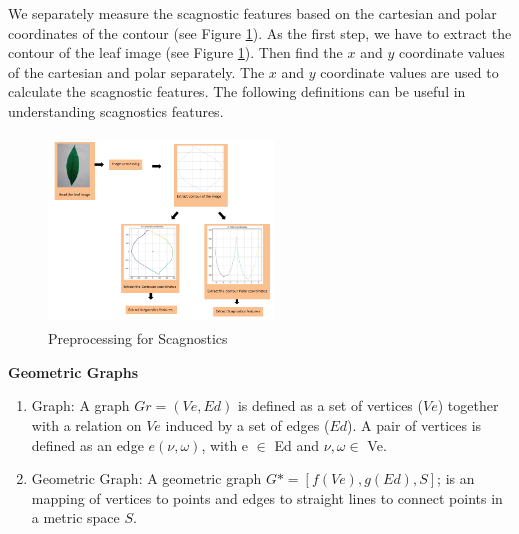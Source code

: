 \documentclass{article}
\begin{document}
We separately measure the scagnostic features based on the cartesian
and polar coordinates of the contour (see Figure \ref{scp}). As the first
step, we have to extract the contour of the leaf image (see Figure
\ref{scp}). Then find the \(x\) and \(y\) coordinate values of the
cartesian and polar separately. The \(x\) and \(y\) coordinate values are
used to calculate the scagnostic features. The following definitions can
be useful in understanding scagnostics features.\\


\begin{figure}[!ht]
        
\centering
        \includegraphics[width=60mm, height=50mm]{Figures/scp.png}
        
        

\caption{\label{scp}Preprocessing for Scagnostics}
        \end{figure}

\textbf{Geometric Graphs}

\begin{enumerate}
\def\labelenumi{\roman{enumi})}
\item
  Graph: A graph \(Gr = (Ve, Ed)\) is defined as a set of vertices
  (\(Ve\)) together with a relation on \(Ve\) induced by a set of edges
  (\(Ed\)). A pair of vertices is defined as an edge \(e(\nu,\omega)\),
  with e \(\in\) Ed and \(\nu,\omega \in\) Ve.
\item
  Geometric Graph: A geometric graph \(G* = [f(Ve), g(Ed), S]\); is an
  mapping of vertices to points and edges to straight lines to connect
  points in a metric space \(S\).
\end{enumerate}
\end{document}

